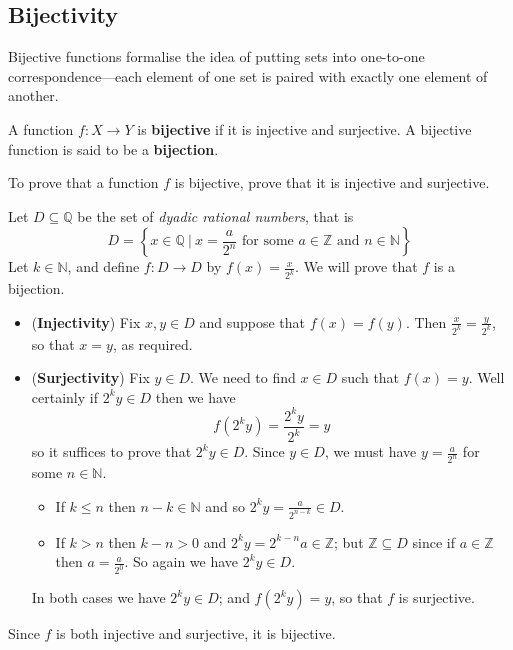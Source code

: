 \subsection*{Bijectivity}

Bijective functions formalise the idea of putting sets into one-to-one correspondence---each element of one set is paired with exactly one element of another.

\begin{definition}
\label{defBijective}\label{defBijection}
A function $f : X \to Y$ is \textbf{bijective} if it is injective and surjective. A bijective function is said to be a \textbf{bijection}.
\end{definition}

\begin{prooftip}
To prove that a function $f$ is bijective, prove that it is injective and surjective.
\end{prooftip}

\begin{example}
\label{exDyadicRationalsBijection}
Let $D \subseteq \mathbb{Q}$ be the set of \textit{dyadic rational numbers}, that is
\[ D = \left\{ x \in \mathbb{Q} \ \bigg|\  x = \frac{a}{2^n} \text{ for some } a \in \mathbb{Z} \text{ and } n \in \mathbb{N} \right\} \]
Let $k \in \mathbb{N}$, and define $f : D \to D$ by $f(x)=\frac{x}{2^k}$. We will prove that $f$ is a bijection.
\begin{itemize}
\item (\textbf{Injectivity}) Fix $x,y \in D$ and suppose that $f(x)=f(y)$. Then $\frac{x}{2^k}=\frac{y}{2^k}$, so that $x=y$, as required.
\item (\textbf{Surjectivity}) Fix $y \in D$. We need to find $x \in D$ such that $f(x)=y$. Well certainly if $2^ky \in D$ then we have \[ f(2^ky)=\frac{2^ky}{2^k}=y \]
so it suffices to prove that $2^ky \in D$.
Since $y \in D$, we must have $y=\frac{a}{2^n}$ for some $n \in \mathbb{N}$.
\begin{itemize}
\item If $k \le n$ then $n-k \in \mathbb{N}$ and so $2^ky=\frac{a}{2^{n-k}} \in D$.
\item If $k > n$ then $k-n>0$ and $2^ky = 2^{k-n}a \in \mathbb{Z}$; but $\mathbb{Z} \subseteq D$ since if $a \in \mathbb{Z}$ then $a=\frac{a}{2^0}$. So again we have $2^ky \in D$.
\end{itemize}
In both cases we have $2^ky \in D$; and $f(2^ky)=y$, so that $f$ is surjective.
\end{itemize}
Since $f$ is both injective and surjective, it is bijective.
\end{example}

